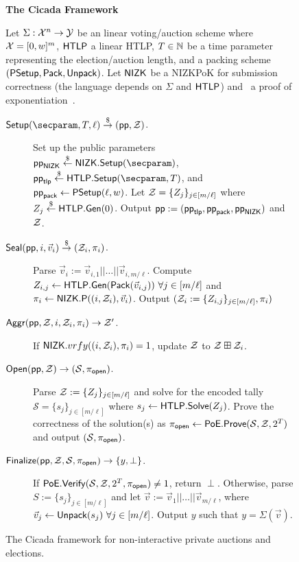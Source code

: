 \begin{figure*}[tbh]
\begin{mdframed}
\begin{center}
    \textbf{The Cicada Framework}
\end{center}
Let $\Sigma: \mathcal{X}^n \rightarrow \mathcal{Y}$ be an linear voting/auction scheme
where 
$\mathcal{X} = [0,w]^m$, $\mathsf{HTLP}$ a linear HTLP, $T \in \mathbb{N}$ be a time parameter representing the election/auction length, and a packing scheme $(\mathsf{PSetup}, \mathsf{Pack}, \mathsf{Unpack})$.
Let $\mathsf{NIZK}$ be a NIZKPoK for 
submission correctness (the language depends on $\Sigma$ and $\mathsf{HTLP}$)
and \poe\ a proof of exponentiation~\cite{ITCS:Pietrzak19b,EC:Wesolowski19}. 

\hrulefill
\begin{description}
    \item[$\Setup(\secparam, \Ttime, \ell) \randout (\pp, \Z)$.] 
    Set up the public parameters $\pp_{\NIZK} \sample \NIZK.\Setup(\secparam)$, $\pp_{\sf tlp} \sample \htlp.\Setup(\secparam, \Ttime)$, and $\mathsf{pp}_{\sf pack} \gets \mathsf{PSetup}(\ell, w)$. 
    Let $\mathcal{Z} = \{Z_j\}_{j \in [m/\ell]}$ where $Z_j \stackrel{\$}{\gets} \mathsf{HTLP}.{\sf Gen}(0)$. Output $\mathsf{pp} := (\mathsf{pp}_{\sf tlp}, \mathsf{pp}_{\sf pack}, \mathsf{pp}_{\mathsf{NIZK}})$ and $\mathcal{Z}$.
    \item[$\mathsf{Seal}(\mathsf{pp},i, \vec{v}_i) \stackrel{\$}{\to} (\mathcal{Z}_i, \pi_i)$.] Parse $\vec{v}_i := \vec{v}_{i,1} || \dots || \vec{v}_{i,m/\ell}$. Compute $Z_{i,j} \gets \mathsf{HTLP}.{\sf Gen}(\mathsf{Pack}(\vec{v}_{i,j}))~\forall j \in [m/\ell]$ and $\pi_i \gets \mathsf{NIZK}.\mathsf{P}((i, \mathcal{Z}_i), \vec{v}_i)$.
    Output $(\mathcal{Z}_i := \{Z_{i,j}\}_{j \in [m/\ell]}, \pi_i)$ 
    \item[$\mathsf{Aggr}(\mathsf{pp},\mathcal{Z},i,\mathcal{Z}_i,\pi_i) \rightarrow \mathcal{Z}'$.] If $\mathsf{NIZK}.vrfy((i, \mathcal{Z}_i), \pi_i) = 1$, update $\mathcal{Z}$ to $\mathcal{Z} \boxplus \mathcal{Z}_i$. %
    \item[$\mathsf{Open}(\mathsf{pp},\mathcal{Z}) \rightarrow (\mathcal{S}, \pi_{\sf open})$.] Parse $\mathcal{Z} := \{Z_j\}_{j \in [m/\ell]}$ and solve for the encoded tally $\mathcal{S} = \{s_j\}_{j \in [m/\ell]}$ where $s_j \gets \mathsf{HTLP}.{\sf Solve}(Z_j)$. Prove the correctness of the solution(s) as $\pi_{\sf open} \gets \mathsf{PoE}.{\sf Prove}(\mathcal{S}, \mathcal{Z}, 2^{T})$ and output $(\mathcal{S}, \pi_{\sf open})$.
    \item[$\mathsf{Finalize}(\mathsf{pp}, \mathcal{Z}, \mathcal{S}, \pi_{\sf open}) \rightarrow \{y,\perp\}$.] If $\mathsf{PoE}.{\sf Verify}(\mathcal{S}, \mathcal{Z}, 2^{T}, \pi_{\sf open}) \neq 1$, return $\perp$. Otherwise, parse $S := \{s_j\}_{j \in [m/\ell]}$ and let $\Vec{v} := \vec{v}_1 || \dots || \vec{v}_{m/\ell}$, where $\vec{v}_j \gets \mathsf{Unpack}(s_j)~\forall j \in [m/\ell]$. Output 
    $y$ such that $y = \Sigma(\vec{v})$.
\end{description}
\end{mdframed}
\caption{The Cicada framework for non-interactive private auctions and elections.}
\label{fig:cicada}
\end{figure*}
